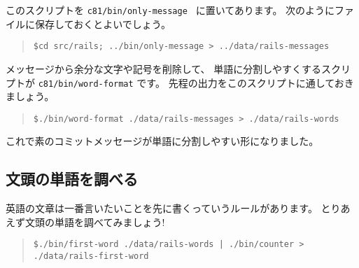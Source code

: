 \documentclass{jarticle}
\begin{document}
このスクリプトを {\tt c81/bin/only-message } に置いてあります。
次のようにファイルに保存しておくとよいでしょう。
\begin{quote}
{\tt \$cd src/rails; ../bin/only-message > ../data/rails-messages }
\end{quote}

メッセージから余分な文字や記号を削除して、
単語に分割しやすくするスクリプトが {\tt c81/bin/word-format} です。
先程の出力をこのスクリプトに通しておきましょう。
\begin{quote}
{\tt \$./bin/word-format ./data/rails-messages > ./data/rails-words }
\end{quote}

これで素のコミットメッセージが単語に分割しやすい形になりました。


  \subsection{文頭の単語を調べる}
  英語の文章は一番言いたいことを先に書くっていうルールがあります。
  とりあえず文頭の単語を調べてみましょう!
  \begin{quote}
   {\tt \$./bin/first-word ./data/rails-words | ./bin/counter > ./data/rails-first-word}
  \end{quote}
\end{document}
